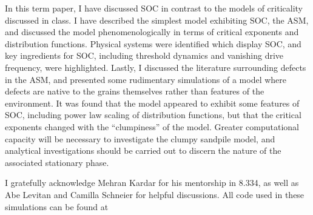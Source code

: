 \documentclass[aps,prb,reprint,superscriptaddress]{revtex4-2}
\begin{document}
In this term paper, I have discussed SOC in contrast to the models of criticality discussed in class. I have described the simplest model exhibiting SOC, the ASM, and discussed the model phenomenologically in terms of critical exponents and distribution functions. Physical systems were identified which display SOC, and key ingredients for SOC, including threshold dynamics and vanishing drive frequency, were highlighted. Lastly, I discussed the literature surrounding defects in the ASM, and presented some rudimentary simulations of a model where defects are native to the grains themselves rather than features of the environment. It was found that the model appeared to exhibit some features of SOC, including power law scaling of distribution functions, but that the critical exponents changed with the ``clumpiness'' of the model. Greater computational capacity will be necessary to investigate the clumpy sandpile model, and analytical investigations should be carried out to discern the nature of the associated stationary phase.

I gratefully acknowledge Mehran Kardar for his mentorship in 8.334, as well as Abe Levitan and Camilla Schneier for helpful discussions. All code used in these simulations can be found at 


\end{document}
